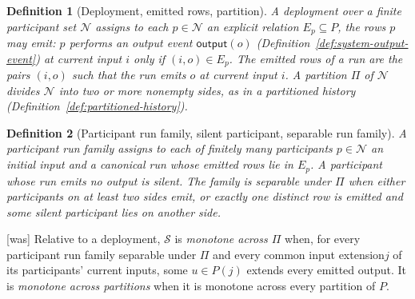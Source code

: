 \documentclass[sigconf]{cidr-2027}
\newtheorem{definition}{Definition}
\theoremstyle{remark}
\newcommand{\indesc}{input extension\xspace} %
\newcommand{\outrel}{extends\xspace}          %
\newcommand{\Spec}{\mathcal{S}}
\newcommand{\fiber}[1]{P(#1)}
\begin{document}
\color{blue!70!black}\begin{definition}[Deployment, emitted rows, partition]
\label{def:deployment}
A \emph{deployment} over a finite participant set $\mathcal N$ assigns to each $p\in\mathcal N$
an explicit relation $E_p\subseteq P$, the rows $p$ may emit: $p$ performs an output event
$\mathsf{output}(o)$ (Definition~\ref{def:system-output-event}) at current input
$i$ only if $(i,o)\in E_p$.  The \emph{emitted rows} of a run are the pairs
$(i,o)$ such that the run emits $o$ at current input $i$.  A \emph{partition} $\Pi$ of $\mathcal N$ divides $\mathcal N$ into
two or more nonempty sides, as in a partitioned history
(Definition~\ref{def:partitioned-history}).\color{black}
\end{definition}

\begin{definition}[Participant run family, silent participant, separable run family]
\label{def:participant-run-family}
A \emph{participant run family} assigns to each of finitely many participants
$p\in\mathcal N$ an initial input and a canonical run whose emitted rows lie in $E_p$.
A participant whose run emits no output is \emph{silent}.  The family is
\emph{separable under $\Pi$} when either participants on at least two
sides emit, or exactly one distinct row is emitted and some silent
participant lies on another side.
\end{definition}



{\footnotesize\color{black!50}\noindent\textsf{[was]} Relative to a deployment, $\Spec$ is \emph{monotone across $\Pi$} when, for
every participant run family separable under $\Pi$ and every common \indesc $j$
of its participants' current inputs, some $u\in\fiber{j}$ \outrel every
emitted output.  It is \emph{monotone across partitions} when it is monotone
across every partition of $P$.\par}
\end{document}

